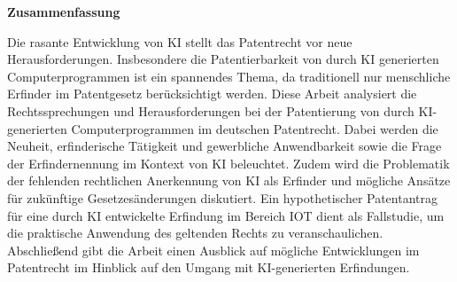\thispagestyle{empty}
\vspace*{0.2cm}

\begin{center}
    \textbf{Zusammenfassung}
\end{center}

\vspace*{0.2cm}

\noindent 
Die rasante Entwicklung von \gls{KI} 
stellt das Patentrecht vor neue Herausforderungen. 
Insbesondere die Patentierbarkeit von durch KI generierten Computerprogrammen 
ist ein spannendes Thema, 
da traditionell nur menschliche Erfinder im Patentgesetz berücksichtigt werden. 
Diese Arbeit analysiert die Rechtssprechungen und Herausforderungen 
bei der Patentierung von durch KI-generierten Computerprogrammen 
im deutschen Patentrecht. 
Dabei werden die Neuheit, erfinderische Tätigkeit und gewerbliche Anwendbarkeit 
sowie die Frage der Erfindernennung im Kontext von KI beleuchtet. 
Zudem wird die Problematik der fehlenden rechtlichen Anerkennung von KI als Erfinder und 
mögliche Ansätze für zukünftige Gesetzesänderungen diskutiert. 
Ein hypothetischer Patentantrag für eine durch KI entwickelte Erfindung 
im Bereich IOT dient als Fallstudie, 
um die praktische Anwendung des geltenden Rechts zu veranschaulichen. 
Abschließend gibt die Arbeit einen Ausblick 
auf mögliche Entwicklungen im Patentrecht 
im Hinblick auf den Umgang mit KI-generierten Erfindungen.